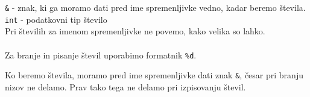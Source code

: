 \documentclass{article}
\begin{document}
\verb+&+ - znak, ki ga moramo dati pred ime spremenljivke vedno, kadar beremo števila.
\verb+int+ - podatkovni tip število \\
Pri številih za imenom spremenljivke ne povemo, kako velika so lahko. \\\\
Za branje in pisanje števil uporabimo formatnik \verb+%d+.

\begin{errors}
Ko beremo števila, moramo pred ime spremenljivke dati znak \verb+&+, česar pri branju nizov ne delamo. Prav tako tega ne delamo pri izpisovanju števil.
\end{errors}
\end{document}
